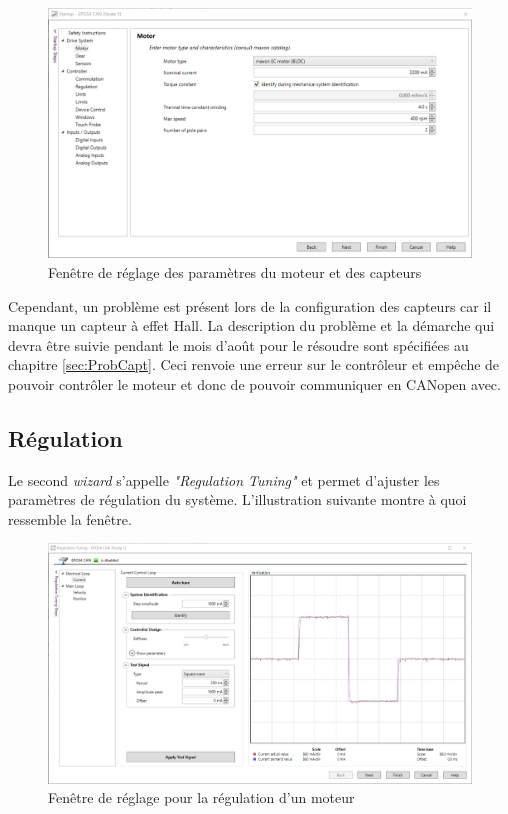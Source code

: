 \begin{figure}[H]
    \centering
    \includegraphics[width = \textwidth]{assets/figures/StartupWizard.png}
    \caption{Fenêtre de réglage des paramètres du moteur et des capteurs}
    \label{fig:StartWizard}
\end{figure}

Cependant, un problème est présent lors de la configuration des capteurs car il manque un capteur à effet Hall. La description du problème et la
démarche qui devra être suivie pendant le mois d'août pour le résoudre sont spécifiées au chapitre \ref{sec:ProbCapt}. Ceci renvoie une erreur sur le contrôleur et empêche de pouvoir
contrôler le moteur et donc de pouvoir communiquer en CANopen avec.\\

\subsection{Régulation}\label{subsec:InitRegul}
Le second \textit{\gls{wizard}} s'appelle \textit{"Regulation Tuning"} et permet d'ajuster les paramètres de régulation du système. L'illustration
suivante montre à quoi ressemble la fenêtre.

\begin{figure}[H]
    \centering
    \includegraphics[width = \textwidth]{assets/figures/RegulationTuning.png}
    \caption{Fenêtre de réglage pour la régulation d'un moteur}
    \label{fig:RegTune}
\end{figure}

